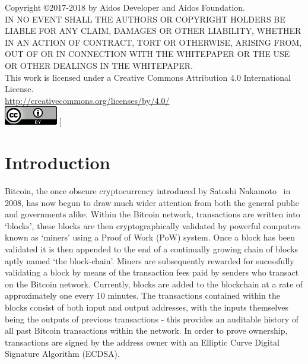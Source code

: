 \documentclass[a4paper,10pt,twocolumn]{article}
\begin{document}
Copyright \copyright 2017-2018 by Aidos Developer and Aidos Foundation. \\

IN NO EVENT SHALL THE AUTHORS OR COPYRIGHT HOLDERS BE LIABLE FOR ANY CLAIM, DAMAGES OR OTHER
LIABILITY, WHETHER IN AN ACTION OF CONTRACT, TORT OR OTHERWISE, ARISING FROM,
OUT OF OR IN CONNECTION WITH THE WHITEPAPER OR THE USE OR OTHER DEALINGS IN
THE WHITEPAPER. \\

This work is licensed under a Creative Commons Attribution 4.0 International License. \\
\url{http://creativecommons.org/licenses/by/4.0/} \\
\includegraphics{cc}
]

\twocolumn[
\tableofcontents
]

\clearpage

\section{Introduction}
Bitcoin, the once obscure cryptocurrency introduced by Satoshi Nakamoto~\cite{btc} in 2008, has now begun to draw much wider attention 
from both the general public and governments alike. Within the Bitcoin network, transactions are written into `blocks', these blocks are 
then cryptographically validated by powerful computers known as `miners' using a Proof of Work (PoW) system. Once a block has been 
validated it is then appended to the end of a continually growing chain of blocks aptly named `the block-chain'. Miners are subsequently
rewarded for sucessfully validating a block by means of the transaction fees paid by senders who transact on the Bitcoin network.
Currently, blocks are added to the blockchain at a rate of approximately one every 10 minutes. The transactions contained within the
blocks consist of both input and output addresses, with the inputs themselves being the outputs of previous transactions - this provides
an auditable history of all past Bitcoin transactions within the network. In order to prove ownership, transactions are signed by the 
address owner with an Elliptic Curve Digital Signature Algorithm (ECDSA).
\end{document}
